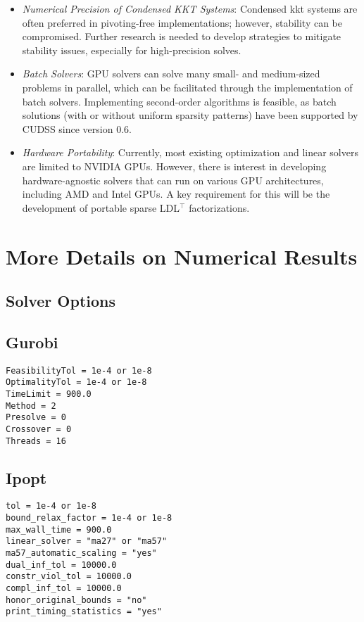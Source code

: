 \documentclass{article}
\begin{document}
\begin{itemize}[leftmargin=*,itemsep=0pt,parsep=0pt,partopsep=0pt]
\item \textit{Numerical Precision of Condensed KKT Systems}: Condensed \gls*{kkt} systems are often preferred in pivoting-free implementations; however, stability can be compromised. Further research is needed to develop strategies to mitigate stability issues, especially for high-precision solves.
\item \textit{Batch Solvers}: GPU solvers can solve many small- and medium-sized problems in parallel, which can be facilitated through the implementation of batch solvers. Implementing second-order algorithms is feasible, as batch solutions (with or without uniform sparsity patterns) have been supported by CUDSS since version 0.6.
\item \textit{Hardware Portability}: Currently, most existing optimization and linear solvers are limited to NVIDIA GPUs. However, there is interest in developing hardware-agnostic solvers that can run on various GPU architectures, including AMD and Intel GPUs. A key requirement for this will be the development of portable sparse LDL$^\top$ factorizations.
\end{itemize}





\pagebreak




\appendix
{}

\section{More Details on Numerical Results}\label{apx:num}
\subsection{Solver Options}
\subsection{Gurobi}
\begin{verbatim}
FeasibilityTol = 1e-4 or 1e-8
OptimalityTol = 1e-4 or 1e-8
TimeLimit = 900.0
Method = 2
Presolve = 0
Crossover = 0
Threads = 16
\end{verbatim}
\subsection{Ipopt}
\begin{verbatim}
tol = 1e-4 or 1e-8
bound_relax_factor = 1e-4 or 1e-8
max_wall_time = 900.0
linear_solver = "ma27" or "ma57"
ma57_automatic_scaling = "yes"
dual_inf_tol = 10000.0
constr_viol_tol = 10000.0
compl_inf_tol = 10000.0
honor_original_bounds = "no"
print_timing_statistics = "yes"
\end{verbatim}
\end{document}
